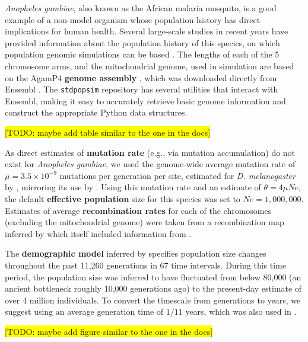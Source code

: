 \documentclass[hidelinks]{article}
\newcommand{\stdpopsim}{\texttt{stdpopsim}\xspace}
\begin{document}
\emph{Anopheles gambiae}, also known as the African malaria mosquito, is a good example
of a non-model organism whose population history has direct implications for human health.
Several large-scale studies in recent years have provided information about the
population history of this species, on which population genomic simulations can be based \citep[e.g.,][]{Miles2017, clarkson2020genome}.
The lengths of each of the 5 chromosome arms, and the mitochondrial genome,
used in simulation are based on the AgamP4 \textbf{genome assembly} \citep{Sharakhova2007}, which 
was downloaded directly from Ensembl \citep{ensembl2021}.
The \stdpopsim repository has several utilities that interact with Ensembl,
making it easy to accurately retrieve basic genome information and construct the appropriate Python data structures.

\colorbox{yellow}{[TODO:  maybe add table similar to the one in the docs]}

As direct estimates of \textbf{mutation rate} (e.g., via mutation accumulation) do not exist for \emph{Anopheles gambiae},
we used the genome-wide average mutation rate of $\mu=3.5 \times 10^{-9}$ mutations per generation per site,
estimated for \emph{D. melanogaster} by \cite{Keightley2009}, mirroring its use by \cite{Miles2017}.
Using this mutation rate and an estimate of $\theta=4\mu Ne$, the default \textbf{effective population} size
for this species was set to $Ne=1,000,000$. 
Estimates of average \textbf{recombination rates} for each of the chromosomes (excluding the mitochondrial genome)
were taken from a recombination map inferred by \cite{Pombi2006} which itself included information from
\citet{zheng1996integrated}.

The \textbf{demographic model} inferred by \cite{Miles2017} specifies
population size changes throughout the past 11,260 generations in 67 time intervals.
During this time period, the population size was inferred to have fluctuated from below 80,000
(an ancient bottleneck roughly 10,000 generations ago) to the present-day estimate of over 4 million individuals.
To convert the timescale from generations to years, we suggest using an average generation time of $1/11$ years,
which was also used in \cite{Miles2017}.

\colorbox{yellow}{[TODO:  maybe add figure similar to the one in the docs]}

\end{document}

